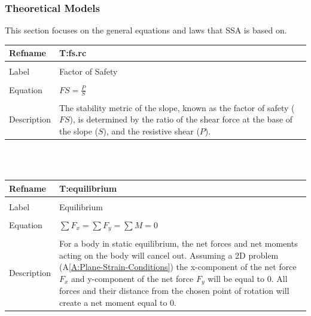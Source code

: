 \documentclass[12pt]{article}
\begin{document}
\subsubsection{Theoretical Models}
\label{Sec:TMs}
This section focuses on the general equations and laws that SSA is based on.
~\newline
\noindent \begin{minipage}{\textwidth}
\begin{tabular}{p{} p{}}
\toprule \textbf{Refname} & \textbf{T:fs.rc}
\label{T:fs.rc}
\\ \midrule \\
Label & Factor of Safety
\\ \midrule \\
Equation & $FS=\frac{P}{S}$
\\ \midrule \\
Description & The stability metric of the slope, known as the factor of safety ($FS$), is determined by the ratio of the shear force at the base of the slope ($S$), and the resistive shear ($P$).
\\ \bottomrule \end{tabular}
\end{minipage}\\
~\newline
\noindent \begin{minipage}{\textwidth}
\begin{tabular}{p{} p{}}
\toprule \textbf{Refname} & \textbf{T:equilibrium}
\label{T:equilibrium}
\\ \midrule \\
Label & Equilibrium
\\ \midrule \\
Equation & $\displaystyle\sum{{F_{x}}}=\displaystyle\sum{{F_{y}}}=\displaystyle\sum{M}=0$
\\ \midrule \\
Description & For a body in static equilibrium, the net forces and net moments acting on the body will cancel out. Assuming a 2D problem (A\ref{A:Plane-Strain-Conditions}) the x-component of the net force ${F_{x}}$ and y-component of the net force ${F_{y}}$ will be equal to $0$. All forces and their distance from the chosen point of rotation will create a net moment equal to $0$.
\\ \bottomrule \end{tabular}
\end{minipage}\\
\end{document}
